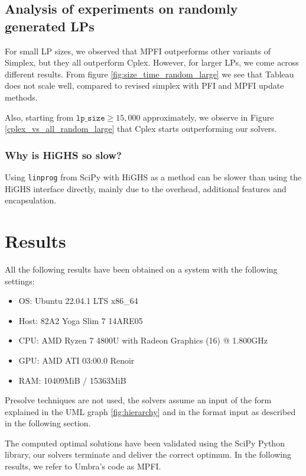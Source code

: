 \subsection{Analysis of experiments on randomly generated LPs}
For small LP sizes, we observed that MPFI outperforms other variants of Simplex, but they all outperform Cplex. However, for
larger LPs, we come across different results.
From figure \ref{fig:size_time_random_large} we see that Tableau does not scale well,
compared to revised simplex with PFI and MPFI update methods.

Also, starting from $\texttt{lp\_size} \geq 15,000$ approximately, we observe in Figure
\ref{cplex_vs_all_random_large} that Cplex starts outperforming our solvers.

\subsubsection{Why is HiGHS  so slow?}
Using \texttt{linprog} from SciPy with HiGHS as a method can be
slower than using the HiGHS interface directly, mainly due to the overhead,
additional features and encapsulation.

\section{Results}
All the following results have been obtained on a system with the following settings:
\begin{itemize}
    \item OS: Ubuntu 22.04.1 LTS x86\_64
    \item Host: 82A2 Yoga Slim 7 14ARE05
    \item CPU: AMD Ryzen 7 4800U with Radeon Graphics (16) @ 1.800GHz
    \item GPU: AMD ATI 03:00.0 Renoir
    \item RAM: 10409MiB / 15363MiB
\end{itemize}

Presolve techniques are not used, the solvers assume an input of the form explained
in the UML graph \ref{fig:hierarchy} and in the format input as described
in the following section.

The computed optimal solutions have been validated using the SciPy Python library,
our solvers terminate and deliver the correct optimum.
In the following results, we refer to Umbra's code as MPFI. 


